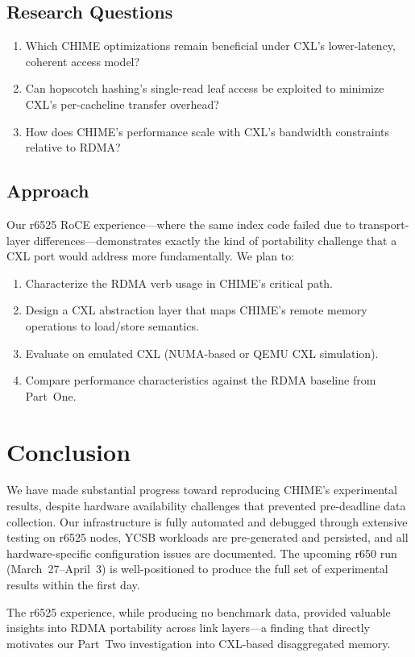 \documentclass[11pt,a4paper]{article}
\begin{document}
\subsection{Research Questions}

\begin{enumerate}[nosep]
    \item Which CHIME optimizations remain beneficial under CXL's lower-latency, coherent access model?
    \item Can hopscotch hashing's single-read leaf access be exploited to minimize CXL's per-cacheline transfer overhead?
    \item How does CHIME's performance scale with CXL's bandwidth constraints relative to RDMA?
\end{enumerate}

\subsection{Approach}

Our r6525 RoCE experience---where the same index code failed due to transport-layer differences---demonstrates exactly the kind of portability challenge that a CXL port would address more fundamentally. We plan to:
\begin{enumerate}[nosep]
    \item Characterize the RDMA verb usage in CHIME's critical path.
    \item Design a CXL abstraction layer that maps CHIME's remote memory operations to load/store semantics.
    \item Evaluate on emulated CXL (NUMA-based or QEMU CXL simulation).
    \item Compare performance characteristics against the RDMA baseline from Part~One.
\end{enumerate}

\section{Conclusion}

We have made substantial progress toward reproducing CHIME's experimental results, despite hardware availability challenges that prevented pre-deadline data collection. Our infrastructure is fully automated and debugged through extensive testing on r6525 nodes, YCSB workloads are pre-generated and persisted, and all hardware-specific configuration issues are documented. The upcoming r650 run (March~27--April~3) is well-positioned to produce the full set of experimental results within the first day.

The r6525 experience, while producing no benchmark data, provided valuable insights into RDMA portability across link layers---a finding that directly motivates our Part~Two investigation into CXL-based disaggregated memory.



\end{document}
